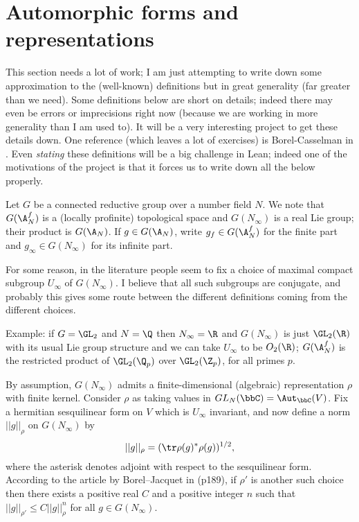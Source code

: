 \section{Automorphic forms and representations}

This section needs a lot of work; I am just attempting to write down some approximation to the (well-known) definitions but in great generality (far greater than we need). Some definitions below are short on details; indeed there may even be errors or imprecisions right now (because we are working in more generality than I am used to). It will be a very interesting project to get these details down. One reference (which leaves a lot of exercises) is Borel-Casselman in \cite{corvallis1}. Even \emph{stating} these definitions will be a big challenge in Lean; indeed one of the motivations of the project is that it forces us to write down all the below properly.

Let $G$ be a connected reductive group over a number field $N$.  We note
that $G(\A_N^f)$ is a (locally profinite) topological space and $G(N_\infty)$ is a real Lie group;
their product is $G(\A_N)$. If $g\in G(\A_N)$, write $g_f\in G(\A_N^f)$ for the finite part and $g_\infty\in G(N_\infty)$ for its infinite part.

For some reason, in the literature people seem to fix a choice of maximal compact subgroup $U_\infty$ of $G(N_\infty)$. I believe that all such subgroups are conjugate, and probably this gives some route between the different definitions coming from the different choices.

Example: if $G=\GL_2$ and $N=\Q$ then $N_\infty=\R$ and $G(N_\infty)$ is just $\GL_2(\R)$ with its usual Lie group structure and we can take $U_\infty$ to be $O_2(\R)$; $G(\A_N^f)$ is the restricted product of $\GL_2(\Q_p)$ over $\GL_2(\Z_p)$, for all primes $p$.

By assumption, $G(N_\infty)$ admits a finite-dimensional (algebraic) representation $\rho$ with finite kernel. Consider $\rho$ as taking values in $GL_N(\bbC)=\Aut_{\bbC}(V)$. Fix a hermitian sesquilinear form on $V$ which
is $U_\infty$ invariant, and now define a norm $||g||_\rho$ on $G(N_\infty)$ by $$||g||_\rho=(\tr \rho(g)^*\rho(g))^{1/2},$$ where the asterisk denotes adjoint with respect to the sesquilinear form. According to the article by Borel--Jacquet in \cite{corvallis1} (p189), if $\rho'$ is another such choice then there exists a positive real $C$ and a positive integer $n$ such that $||g||_{\rho'}\leq C||g||_\rho^n$ for all $g\in G(N_\infty)$.

